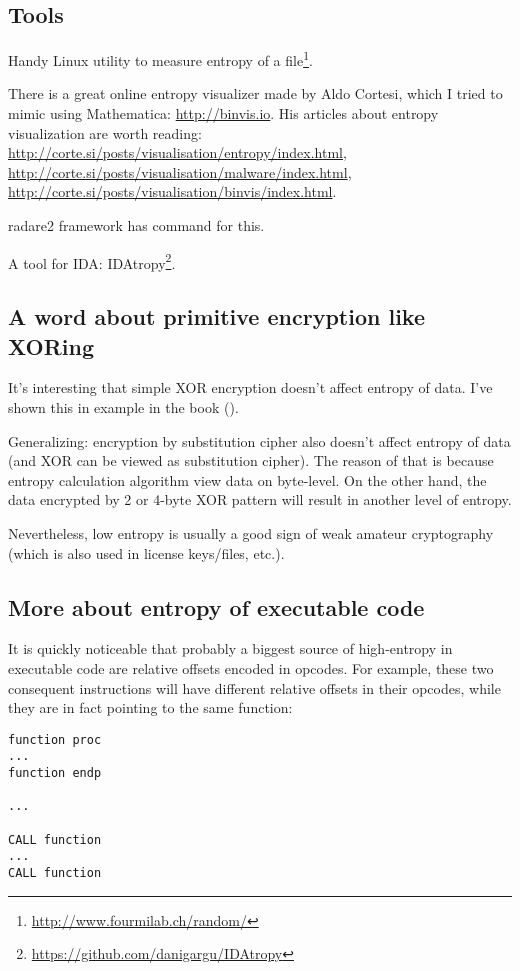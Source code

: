 \subsection{Tools}

Handy Linux  utility to measure entropy of a file\footnote{\url{http://www.fourmilab.ch/random/}}.

There is a great online entropy visualizer made by Aldo Cortesi, 
which I tried to mimic using Mathematica: \url{http://binvis.io}.
His articles about entropy visualization are worth reading:
\url{http://corte.si/posts/visualisation/entropy/index.html},
\url{http://corte.si/posts/visualisation/malware/index.html},
\url{http://corte.si/posts/visualisation/binvis/index.html}.

radare2 framework has  command for this.

A tool for IDA: IDAtropy\footnote{\url{https://github.com/danigargu/IDAtropy}}.

\subsection{A word about primitive encryption like XORing}

It's interesting that simple XOR encryption doesn't affect entropy of data.
I've shown this in  example in the book ().

Generalizing: encryption by substitution cipher also doesn't affect entropy of data
(and XOR can be viewed as substitution cipher).
The reason of that is because entropy calculation algorithm view data on byte-level.
On the other hand, the data encrypted by 2 or 4-byte XOR pattern will result in another level of entropy.

Nevertheless, low entropy is usually a good sign of weak amateur cryptography
(which is also used in license keys/files, etc.).

\subsection{More about entropy of executable code}

It is quickly noticeable that probably a biggest source of high-entropy in executable code
are relative offsets encoded in opcodes.
For example, these two consequent instructions will have different relative offsets in their opcodes, 
while they are in fact pointing to the same function:

\begin{lstlisting}[style=customasmx86]
function proc
...
function endp

...

CALL function
...
CALL function
\end{lstlisting}

